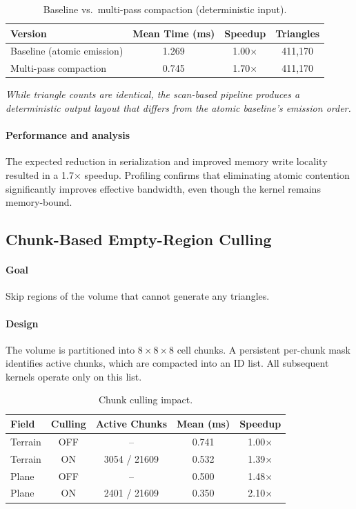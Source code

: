 \documentclass[11pt,a4paper]{article}
\begin{document}
\begin{table}[H]
\centering
\caption{Baseline vs.\ multi-pass compaction (deterministic input).}
\label{tab:opt1_results}
\begin{tabular}{lccc}
\toprule
Version & Mean Time (ms) & Speedup & Triangles \\
\midrule
Baseline (atomic emission) & 1.269 & 1.00$\times$ & 411,170 \\
Multi-pass compaction & 0.745 & 1.70$\times$ & 411,170 \\
\bottomrule
\end{tabular}
\end{table}
\textit{While triangle counts are identical, the scan-based pipeline produces a deterministic output layout that differs from the atomic baseline’s emission order.}
\paragraph{Performance and analysis}
The expected reduction in serialization and improved memory write locality resulted in a 1.7$\times$ speedup. Profiling confirms that eliminating atomic contention significantly improves effective bandwidth, even though the kernel remains memory-bound.


\subsection{Chunk-Based Empty-Region Culling}

\paragraph{Goal}
Skip regions of the volume that cannot generate any triangles.

\paragraph{Design}
The volume is partitioned into $8\times8\times8$ cell chunks. A persistent per-chunk mask identifies active chunks, which are compacted into an ID list. All subsequent kernels operate only on this list.

\begin{table}[H]
\centering
\caption{Chunk culling impact.}
\label{tab:opt2_results}
\begin{tabular}{lcccc}
\toprule
Field & Culling & Active Chunks & Mean (ms) & Speedup \\
\midrule
Terrain & OFF & -- & 0.741 & 1.00$\times$ \\
Terrain & ON  & 3054 / 21609 & 0.532 & 1.39$\times$ \\
Plane   & OFF & -- & 0.500 & 1.48$\times$ \\
Plane   & ON  & 2401 / 21609 & 0.350 & 2.10$\times$ \\
\bottomrule
\end{tabular}
\end{table}
\end{document}
